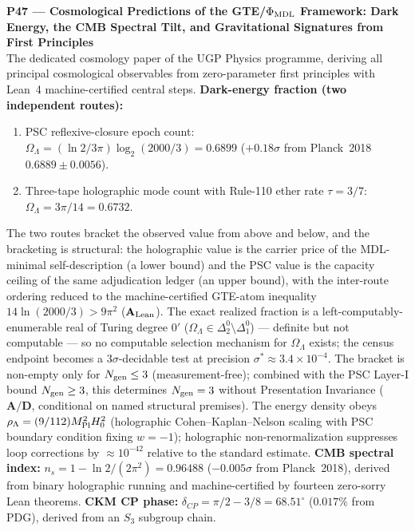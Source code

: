 \documentclass[11pt]{article}
\newcommand{\CatAL}{\ensuremath{\textbf{A}_{\rm Lean}}}
\newcommand{\CatAD}{\textbf{A/D}}
\begin{document}
\medskip
\noindent\textbf{P47 — Cosmological Predictions of the GTE/$\Phi_{\rm MDL}$ Framework: Dark Energy, the CMB Spectral Tilt, and Gravitational Signatures from First Principles}~\cite{SpivackGTECosmology}\\
The dedicated cosmology paper of the UGP Physics programme, deriving all principal
cosmological observables from zero-parameter first principles with Lean~4 machine-certified
central steps.
\textbf{Dark-energy fraction (two independent routes):}
\begin{enumerate}[noitemsep,topsep=2pt]
  \item PSC reflexive-closure epoch count:
    $\Omega_\Lambda = (\ln 2/3\pi)\log_2(2000/3) = 0.6899$ ($+0.18\sigma$ from
    Planck~2018 $0.6889 \pm 0.0056$).
  \item Three-tape holographic mode count with Rule-110 ether rate $\tau = 3/7$:
    $\Omega_\Lambda = 3\pi/14 = 0.6732$.
\end{enumerate}
The two routes bracket the observed value from above and below, and the bracketing is
structural: the holographic value is the carrier price of the MDL-minimal
self-description (a lower bound) and the PSC value is the capacity ceiling of the same
adjudication ledger (an upper bound), with the inter-route ordering reduced to the
machine-certified GTE-atom inequality $14\ln(2000/3) > 9\pi^2$ ($\CatAL$).  The exact
realized fraction is a left-computably-enumerable real of Turing degree $0'$
($\Omega_\Lambda \in \Delta_2^0 \setminus \Delta_1^0$) --- definite but not computable
--- so no computable selection mechanism for $\Omega_\Lambda$ exists; the census
endpoint becomes a $3\sigma$-decidable test at precision
$\sigma^* \approx 3.4\times10^{-4}$.  The bracket is non-empty only for
$N_{\rm gen} \le 3$ (measurement-free); combined with the PSC Layer-I bound
$N_{\rm gen} \ge 3$, this determines $N_{\rm gen} = 3$ without Presentation Invariance
($\CatAD$, conditional on named structural premises).  The energy density
obeys $\rho_\Lambda = (9/112)M_{\rm Pl}^2 H_0^2$ (holographic Cohen--Kaplan--Nelson
scaling with PSC boundary condition fixing $w = -1$); holographic non-renormalization
suppresses loop corrections by $\approx 10^{-42}$ relative to the standard estimate.
\textbf{CMB spectral index:} $n_s = 1 - \ln 2/(2\pi^2) = 0.96488$ ($-0.005\sigma$ from
Planck~2018), derived from binary holographic running and machine-certified by fourteen
zero-sorry Lean theorems.
\textbf{CKM CP phase:} $\delta_{CP} = \pi/2 - 3/8 = 68.51^\circ$ ($0.017\%$ from PDG),
derived from an $S_3$ subgroup chain.
\end{document}
